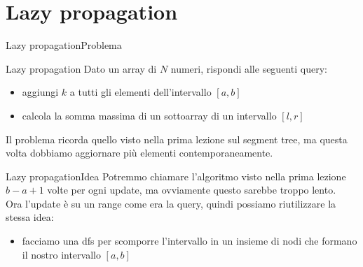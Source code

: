 \documentclass[compress]{beamer}
\begin{document}
\section{Lazy propagation}

\begin{frame}{Lazy propagation}{Problema}
    \begin{exampleblock}{Lazy propagation}
        Dato un array di $N$ numeri, rispondi alle seguenti query:
        \begin{itemize}
            \item aggiungi $k$ a tutti gli elementi dell'intervallo $[a, b]$
            \item calcola la somma massima di un sottoarray di un intervallo $[l, r]$
        \end{itemize}
    \end{exampleblock}
    Il problema ricorda quello visto nella prima lezione sul segment tree, ma questa volta dobbiamo 
    aggiornare più elementi contemporaneamente.
\end{frame}

\begin{frame}{Lazy propagation}{Idea}
    Potremmo chiamare l'algoritmo visto nella prima lezione $b-a+1$ volte per ogni update, ma ovviamente questo 
    sarebbe troppo lento.\\
    \pause
    Ora l'update è su un range come era la query, quindi possiamo riutilizzare la stessa idea:
    \begin{itemize}
        \item facciamo una dfs per scomporre l'intervallo in un insieme di nodi che formano il nostro intervallo $[a,b]$
    \end{itemize}
    \vfill
\end{frame}
\end{document}
